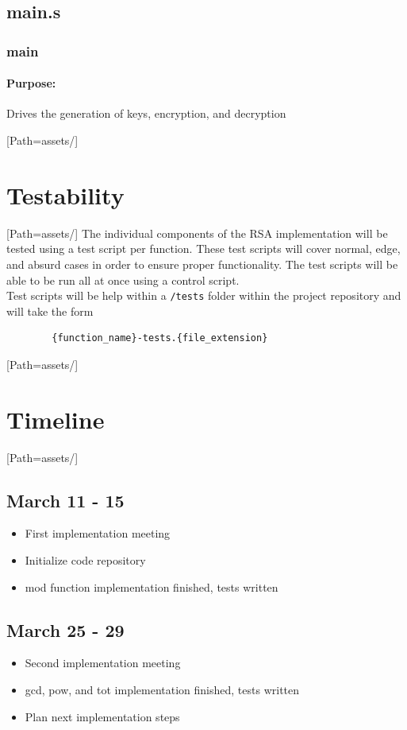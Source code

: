 \documentclass{article}
\begin{document}
    \subsection{main.s}
        \subsubsection{main}
        \paragraph*{Purpose:}
                {Drives the generation of keys, encryption, and decryption }
\newpage

\setmainfont{OpenSans-VariableFont_wdth,wght.ttf}[Path=assets/]
\section{Testability}
\setmainfont{OpenSans-VariableFont_wdth,wght.ttf}[Path=assets/]
    The individual components of the RSA implementation will be tested using a test script per function.
    These test scripts will cover normal, edge, and absurd cases in order to ensure proper functionality.
    The test scripts will be able to be run all at once using a control script.
    \\
    Test scripts will be help within a \verb|/tests| folder within the project repository and will take the form
    \begin{verbatim}
        {function_name}-tests.{file_extension}
    \end{verbatim}
\newpage

\setmainfont{OpenSans-VariableFont_wdth,wght.ttf}[Path=assets/]
\section{Timeline}
\setmainfont{OpenSans-VariableFont_wdth,wght.ttf}[Path=assets/]
    \subsection{March 11 - 15}
        \begin{itemize}
            \item First implementation meeting
            \item Initialize code repository
            \item mod function implementation finished, tests written
        \end{itemize}
    \subsection{March 25 - 29}
         \begin{itemize}
            \item Second implementation meeting
            \item gcd, pow, and tot implementation finished, tests written
            \item Plan next implementation steps
        \end{itemize}
\end{document}
